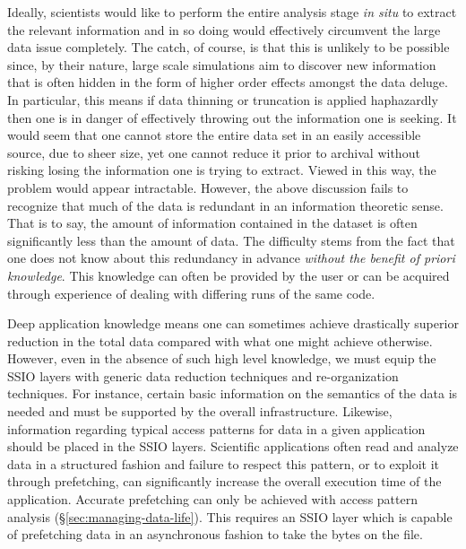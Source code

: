 Ideally, scientists would like to perform the entire analysis stage {\em in situ}
to extract the relevant information and in so doing would effectively
circumvent the large data issue completely.  The catch, of course, is that this
is unlikely to be possible since, by their nature, large scale simulations aim
to discover new information that is often hidden in the form of higher order
effects amongst the data deluge. In particular, this means if data thinning or
truncation is applied haphazardly then one is in danger of effectively throwing
out the information one is seeking. It would seem that one cannot store the
entire data set in an easily accessible source, due to sheer size, yet one
cannot reduce it prior to archival without risking losing the information one
is trying to extract.  Viewed in this way, the problem would appear
intractable. However, the above discussion fails to recognize that much of the
data is redundant in an information theoretic sense.  That is to say, the
amount of information contained in the dataset is often significantly less than
the amount of data.  The difficulty stems from the fact that one does not know
about this redundancy in advance \emph{without the benefit of priori
knowledge}. This knowledge can often be provided by the user or can be acquired
through experience of dealing with differing runs of the same code. 

Deep application knowledge means one can sometimes achieve drastically superior
reduction in the total data compared with what one might achieve otherwise.
However, even in the absence of such high level knowledge, we must equip the
SSIO layers with generic data reduction techniques and re-organization
techniques. For instance, certain basic information on the semantics of the
data is needed and must be supported by the overall infrastructure. Likewise,
information regarding typical access patterns for data in a given application
should be placed in the SSIO layers. Scientific applications often read and
analyze data in a structured fashion and failure to respect this pattern, or to
exploit it through prefetching, can significantly increase the overall
execution time of the application. Accurate prefetching can only be achieved
with access pattern analysis (\S\ref{sec:managing-data-life}). This requires an SSIO layer which is capable of
prefetching data in an asynchronous fashion to take the bytes on the file.

